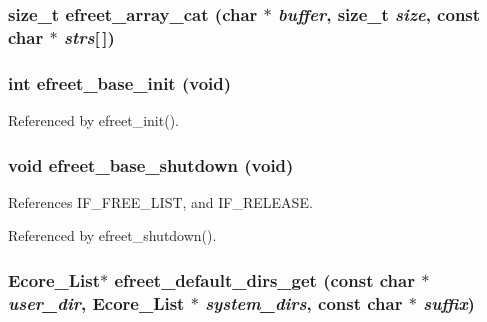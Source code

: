 \subsubsection[efreet\_\-array\_\-cat]{\setlength{\rightskip}{0pt plus 5cm}size\_\-t efreet\_\-array\_\-cat (char $\ast$ {\em buffer}, \/  size\_\-t {\em size}, \/  const char $\ast$ {\em strs}[$\,$])}\label{group__Efreet__Private_ge567e8f87e24148d9a37fa81626c1cc9}


\subsubsection[efreet\_\-base\_\-init]{\setlength{\rightskip}{0pt plus 5cm}int efreet\_\-base\_\-init (void)}\label{group__Efreet__Private_gd419150d5b580bc0b63cdc1c8a4fcd99}




Referenced by efreet\_\-init().
\subsubsection[efreet\_\-base\_\-shutdown]{\setlength{\rightskip}{0pt plus 5cm}void efreet\_\-base\_\-shutdown (void)}\label{group__Efreet__Private_gcd160bc890524bdac0f9bf043f4ddbbd}




References IF\_\-FREE\_\-LIST, and IF\_\-RELEASE.

Referenced by efreet\_\-shutdown().
\subsubsection[efreet\_\-default\_\-dirs\_\-get]{\setlength{\rightskip}{0pt plus 5cm}Ecore\_\-List$\ast$ efreet\_\-default\_\-dirs\_\-get (const char $\ast$ {\em user\_\-dir}, \/  Ecore\_\-List $\ast$ {\em system\_\-dirs}, \/  const char $\ast$ {\em suffix})}\label{group__Efreet__Private_g35c792e4c087a1ca5ed74c70910cc523}


